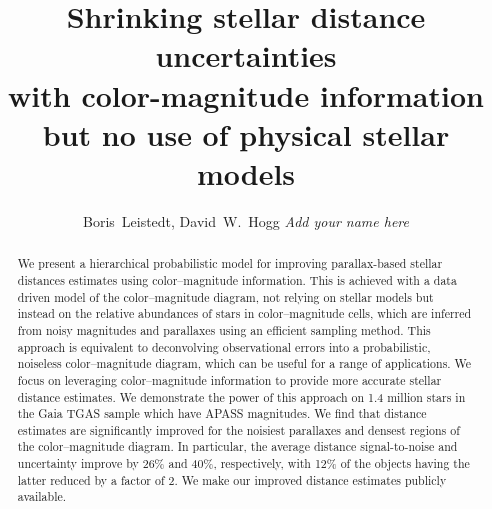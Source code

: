 \documentclass[manuscript, letterpaper]{aastex6}
\makeatletter
\let\origsection\section
\renewcommand\section{\@ifstar{\starsection}{\nostarsection}}
\newcommand\nostarsection[1]{\sectionprelude\origsection{#1}}
\newcommand\starsection[1]{\sectionprelude\origsection*{#1}}
\newcommand\sectionprelude{\vspace{1em}}
\makeatother
\begin{document}
 
\title{Shrinking stellar distance uncertainties\\
 with color-magnitude information \\
  but no use of physical stellar models}
  


\author{
	Boris~Leistedt,
	David~W.~Hogg
	\textit{Add your name here}
	}


  

\begin{abstract}
We present a hierarchical probabilistic model for improving parallax-based stellar distances estimates using color--magnitude information. 
This is achieved with a data driven model of the color--magnitude diagram, not relying on stellar models but instead on the  relative abundances of stars in color--magnitude cells, which are inferred from noisy magnitudes and parallaxes using an efficient sampling method.
This approach is equivalent to deconvolving observational errors into a probabilistic, noiseless color--magnitude diagram, which can be useful for a range of applications. 
We focus on leveraging color--magnitude information to provide more accurate stellar distance estimates.
We demonstrate the power of this approach on 1.4 million stars in the Gaia TGAS sample which have APASS magnitudes.
We find that distance estimates are significantly improved for the noisiest parallaxes and densest regions of the color--magnitude diagram. 
In particular, the average distance signal-to-noise and uncertainty improve by 26\% and 40\%, respectively, with 12\% of the objects having the latter reduced by a factor of 2.
We make our improved distance estimates publicly available.
\end{abstract}


\newpage
\section{Introduction}
\end{document}
